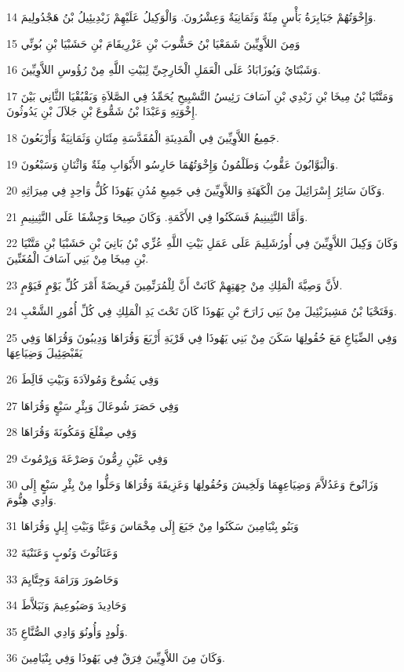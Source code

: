 \par 14 وَإِخْوَتُهُمْ جَبَابِرَةُ بَأْسٍ مِئَةٌ وَثَمَانِيَةٌ وَعِشْرُونَ. وَالْوَكِيلُ عَلَيْهِمْ زَبْدِيئِيلُ بْنُ هَجْدُولِيمَ.
\par 15 وَمِنَ اللاَّوِيِّينَ شَمَعْيَا بْنُ حَشُّوبَ بْنِ عَزْرِيقَامَ بْنِ حَشَبْيَا بْنِ بُونِّي
\par 16 وَشَبْتَايُ وَيُوزَابَادُ عَلَى الْعَمَلِ الْخَارِجِيِّ لِبَيْتِ اللَّهِ مِنْ رُؤُوسِ اللاَّوِيِّينَ.
\par 17 وَمَتَّنْيَا بْنُ مِيخَا بْنِ زَبْدِي بْنِ آسَافَ رَئِيسُ التَّسْبِيحِ يُحَمِّدُ فِي الصَّلاَةِ وَبَقْبُقْيَا الثَّانِي بَيْنَ إِخْوَتِهِ وَعَبْدَا بْنُ شَمُّوعَ بْنِ جَلاَلَ بْنِ يَدُوثُونَ.
\par 18 جَمِيعُ اللاَّوِيِّينَ فِي الْمَدِينَةِ الْمُقَدَّسَةِ مِئَتَانِ وَثَمَانِيَةٌ وَأَرْبَعُونَ.
\par 19 وَالْبَوَّابُونَ عَقُّوبُ وَطَلْمُونُ وَإِخْوَتُهُمَا حَارِسُو الأَبْوَابِ مِئَةٌ وَاثْنَانِ وَسَبْعُونَ.
\par 20 وَكَانَ سَائِرُ إِسْرَائِيلَ مِنَ الْكَهَنَةِ وَاللاَّوِيِّينَ فِي جَمِيعِ مُدُنِ يَهُوذَا كُلُّ وَاحِدٍ فِي مِيرَاثِهِ.
\par 21 وَأَمَّا النَّثِينِيمُ فَسَكَنُوا فِي الأَكَمَةِ. وَكَانَ صِيحَا وَجِشْفَا عَلَى النَّثِينِيمِ.
\par 22 وَكَانَ وَكِيلَ اللاَّوِيِّينَ فِي أُورُشَلِيمَ عَلَى عَمَلِ بَيْتِ اللَّهِ عُزِّي بْنُ بَانِيَ بْنِ حَشَبْيَا بْنِ مَتَّنْيَا بْنِ مِيخَا مِنْ بَنِي آسَافَ الْمُغَنِّينَ.
\par 23 لأَنَّ وَصِيَّةَ الْمَلِكِ مِنْ جِهَتِهِمْ كَانَتْ أَنَّ لِلْمُرَنِّمِينَ فَرِيضَةً أَمْرَ كُلِّ يَوْمٍ فَيَوْمٍ.
\par 24 وَفَتَحْيَا بْنُ مَشِيزَبْئِيلَ مِنْ بَنِي زَارَحَ بْنِ يَهُوذَا كَانَ تَحْتَ يَدِ الْمَلِكِ فِي كُلِّ أُمُورِ الشَّعْبِ.
\par 25 وَفِي الضِّيَاعِ مَعَ حُقُولِهَا سَكَنَ مِنْ بَنِي يَهُوذَا فِي قَرْيَةِ أَرْبَعَ وَقُرَاهَا وَدِيبُونَ وَقُرَاهَا وَفِي يَقَبْصَِئِيلَ وَضِيَاعِهَا
\par 26 وَفِي يَشُوعَ وَمُولاَدَةَ وَبَيْتِ فَالَِطَ
\par 27 وَفِي حَصَرَ شُوعَالَ وَبِئْرِ سَبْعٍ وَقُرَاهَا
\par 28 وَفِي صِقْلَغَ وَمَكُونَةَ وَقُرَاهَا
\par 29 وَفِي عَيْنِ رِمُّونَ وَصَرْعَةَ وَيِرْمُوثَ
\par 30 وَزَانُوحَ وَعَدُلاَّمَ وَضِيَاعِهِمَا وَلَخِيشَ وَحُقُولِهَا وَعَزِيقَةَ وَقُرَاهَا وَحَلُّوا مِنْ بِئْرِ سَبْعٍ إِلَى وَادِي هِنُّومَ.
\par 31 وَبَنُو بِنْيَامِينَ سَكَنُوا مِنْ جَبَعَ إِلَى مِخْمَاسَ وَعَيَّا وَبَيْتِ إِيلٍ وَقُرَاهَا
\par 32 وَعَنَاثُوثَ وَنُوبٍ وَعَنَنْيَةَ
\par 33 وَحَاصُورَ وَرَامَةَ وَجِتَّايِمَ
\par 34 وَحَادِيدَ وَصَبُوعِيمَ وَنَبَلاَّطَ
\par 35 وَلُودٍ وَأُونُوَ وَادِي الصُّنَّاعِ.
\par 36 وَكَانَ مِنَ اللاَّوِيِّينَ فِرَقٌ فِي يَهُوذَا وَفِي بِنْيَامِينَ.

